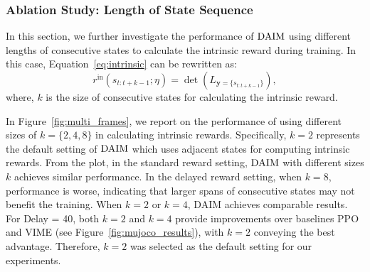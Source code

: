 \subsubsection{Ablation Study: Length of State Sequence}
In this section, we further investigate the performance of $\text{DAIM}$ using different lengths of consecutive states to calculate the intrinsic reward during training. In this case, Equation~\eqref{eq:intrinsic} can be rewritten as:
\begin{equation}
    r^{\text{in}}(s_{t:t+k-1}; \eta) = \det\left(L_{\bm{y}=\{s_{t:t+k-1}\}}\right),
\label{eq:intrinsic_multi_frame}
\end{equation}
where, $k$ is the size of consecutive states for calculating the intrinsic reward.

In Figure~\ref{fig:multi_frames}, we report on the performance of using different sizes of $k=\{2, 4, 8\}$ in calculating intrinsic rewards.  Specifically, $k=2$ represents the default setting of $\text{DAIM}$ which uses adjacent states for computing intrinsic rewards. From the plot, in the standard reward setting, $\text{DAIM}$ with different sizes $k$ achieves similar performance. In the delayed reward setting, when $k=8$, performance is worse, indicating that larger spans of consecutive states may not benefit the training. When $k=2$ or $k=4$, DAIM achieves comparable results. For Delay = 40, both $k=2$ and $k=4$ provide improvements over baselines PPO and VIME (see Figure~\ref{fig:mujoco_results}), with $k=2$ conveying the best advantage.  Therefore, $k=2$ was selected as the default setting for our experiments.

